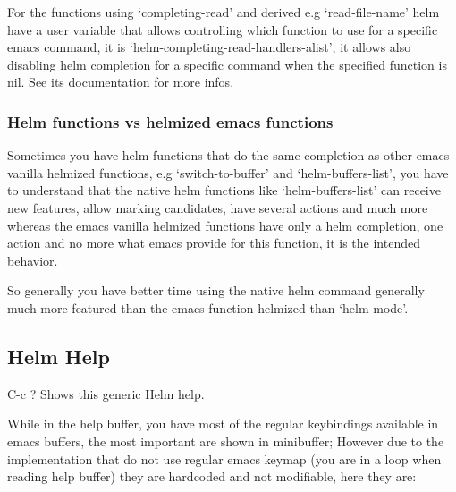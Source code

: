 \documentclass[11pt]{article}
\begin{document}
For the functions using ‘completing-read’ and derived e.g ‘read-file-name’ helm
have a user variable that allows controlling which function to use for a specific
emacs command, it is ‘helm-completing-read-handlers-alist’, it allows also
disabling helm completion for a specific command when the specified
function is nil.
See its documentation for more infos.

\subsubsection{Helm functions vs helmized emacs functions}
\label{sec:orga425187}

Sometimes you have helm functions that do the same completion as other
emacs vanilla helmized functions, e.g ‘switch-to-buffer’ and
‘helm-buffers-list’, you have to understand that the native helm
functions like ‘helm-buffers-list’ can receive new features, allow
marking candidates, have several actions and much more whereas the
emacs vanilla helmized functions have only a helm completion, one
action and no more what emacs provide for this function, it is the
intended behavior.

So generally you have better time using the native helm command generally
much more featured than the emacs function helmized than ‘helm-mode’.

\subsection{Helm Help}
\label{sec:orgfe9e884}

C-c ?		Shows this generic Helm help.

While in the help buffer, you have most of the regular keybindings
available in emacs buffers, the most important are shown in
minibuffer; However due to the implementation that do not use regular
emacs keymap (you are in a loop when reading help buffer) they are
hardcoded and not modifiable, here they are:
\end{document}
